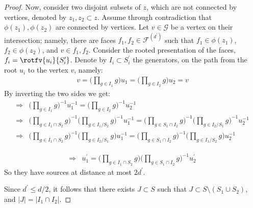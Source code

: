 \begin{proof}
Now, consider two disjoint subsets of $z$, which are not connected by vertices, denoted by $z_{1}, z_{2} \subset z$. Assume through contradiction that $\phi(z_{1}), \phi(z_{2})$ are connected by vertices. Let $v \in \mathcal{G}$ be a vertex on their intersection; namely, there are faces $f_{1}, f_{2} \in \mathcal{F}^{(d^{\prime})}$ such that $f_{1} \in \phi(z_{1})$, $f_{2} \in \phi(z_{2})$, and $v \in f_{1}, f_{2}$. Consider the rooted presentation of the faces, $f_{i} = \rotfv{u_{i}}{S^{\prime}_{i}}$.
Denote by $I_{i} \subset S^{\prime}_{i}$ the generators, on the path from the root $u_{i}$ to the vertex $v$, namely:  
\begin{equation*}
  \begin{split}
    v = \bigl(\prod_{g \in I_{1}} g \bigr) u_{1}  =   \bigl(\prod_{g \in I_{2}} g \bigr) u_{2}  = v
  \end{split}
\end{equation*}
By inverting the two sides we get:  
\begin{equation*}
  \begin{split}
    \Rightarrow & \bigl(\prod_{g \in I_{1}} g \bigr)^{-1} u^{-1}_{1}  =   \bigl(\prod_{g \in I_{2}} g \bigr)^{-1} u^{-1}_{2}  \\
    \Rightarrow & \bigl(\prod_{g \in I_{1}\cap S_{2}} g \bigr)^{-1}\bigl(\prod_{g \in I_{1}/S_{2}} g \bigr)^{-1} u^{-1}_{1}  =   \bigl(\prod_{g \in S_{1} \cap I_{2}} g \bigr)^{-1}\bigl(\prod_{g \in I_{2} / S_{1}} g \bigr)^{-1} u^{-1}_{2}  \\
    \Rightarrow & \bigl(\prod_{g \in I_{1}\cap S_{2}} g \bigr)^{-1}\bigl(\prod_{g \in I_{2}/S_{1}} g \bigr) u^{-1}_{1}  =   \bigl(\prod_{g \in S_{1} \cap I_{2}} g \bigr)^{-1}\bigl(\prod_{g \in I_{1} / S_{2}} g \bigr) u^{-1}_{2}  
  \end{split}
\end{equation*}



\begin{equation*}
  \begin{split}
    \Rightarrow & u^{\prime}_{1}  =  \bigl(\prod_{g \in I_{1}\cap S_{2}} g \bigr) \bigl(\prod_{g \in S_{1} \cap I_{2}} g \bigr)^{-1} u^{\prime}_{2}  
  \end{split}
\end{equation*} So they have sources at distance at most $2d^{\prime}$. 

Since $d^{\prime} \le d/2$, it follows that there exists $J \subset S$ such that $J \subset S \setminus (S_{1} \cup S_{2})$, and $|J| = |I_{1} \cap I_{2}|$.


\end{proof}
